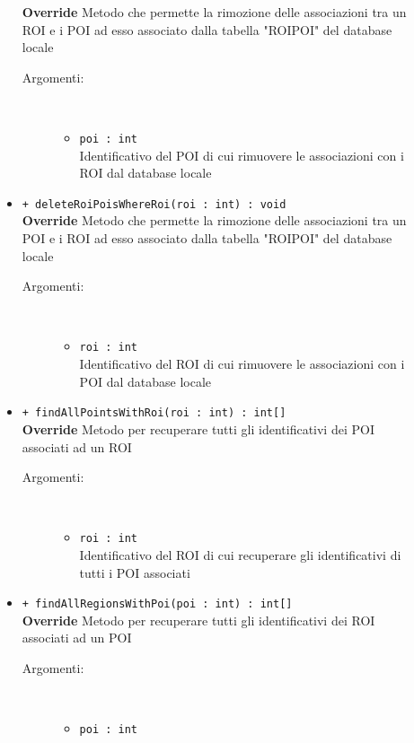 \documentclass[../DefinizioneDiProdotto.tex]{subfiles}
\begin{document}
\begin{description}
\begin{itemize}
		\textbf{Override} Metodo che permette la rimozione delle associazioni tra un ROI e i POI ad esso associato dalla tabella "ROIPOI" del database locale 
		\begin{description}
			\item[Argomenti:] \
			\begin{itemize}
				\item \texttt{poi : int}\\
				Identificativo del POI di cui rimuovere le associazioni con i ROI dal database locale\end{itemize}
		\end{description}
		\item \texttt{+ deleteRoiPoisWhereRoi(roi : int) : void}\\
		\textbf{Override} Metodo che permette la rimozione delle associazioni tra un POI e i ROI ad esso associato dalla tabella "ROIPOI" del database locale 
		\begin{description}
			\item[Argomenti:] \
			\begin{itemize}
				\item \texttt{roi : int}\\
				Identificativo del ROI di cui rimuovere le associazioni con i POI dal database locale\end{itemize}
		\end{description}
		\item \texttt{+ findAllPointsWithRoi(roi : int) : int[]}\\
		\textbf{Override} Metodo per recuperare tutti gli identificativi dei POI associati ad un ROI 
		\begin{description}
			\item[Argomenti:] \
			\begin{itemize}
				\item \texttt{roi : int}\\
				Identificativo del ROI di cui recuperare gli identificativi di tutti i POI associati\end{itemize}
		\end{description}
		\item \texttt{+ findAllRegionsWithPoi(poi : int) : int[]}\\
		\textbf{Override} Metodo per recuperare tutti gli identificativi dei ROI associati ad un POI 
		\begin{description}
			\item[Argomenti:] \
			\begin{itemize}
				\item \texttt{poi : int}\\

\end{itemize}
\end{description}
\end{itemize}
\end{description}
\end{document}
